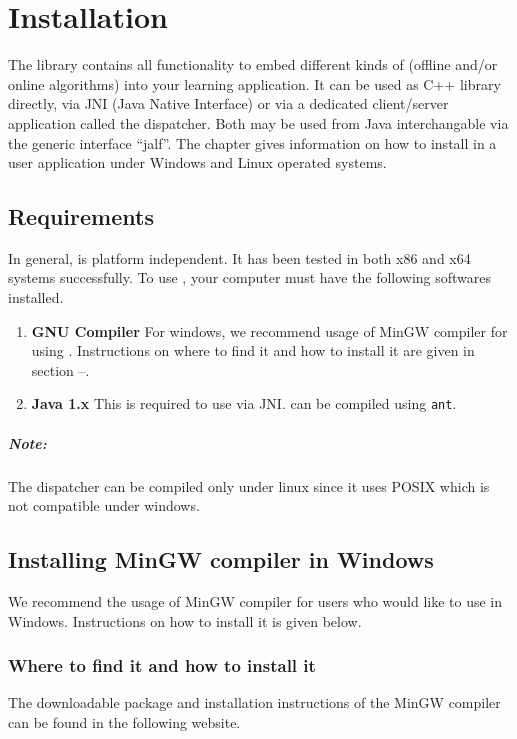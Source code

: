 
\chapter{Installation}
The \libalf library contains all functionality to embed different kinds of (offline and/or online algorithms) into your learning application. It can be used as C++ library directly, via JNI (Java Native Interface) or via a dedicated client/server application called the dispatcher. Both may be used from Java interchangable via the generic interface ``jalf''.
The chapter gives information on how to install \libalf in a user application under Windows and Linux operated systems.

\section{Requirements}
In general, \libalf is platform independent. It has been tested in both x86 and x64 systems successfully. To use \libalf, your computer must have the following softwares installed.
\begin{enumerate}
 \item \textbf{GNU Compiler} \vskip 1pt
	For windows, we recommend usage of MinGW compiler for using \libalf. Instructions on where to find it and how to install it are given in section --.
 \item \textbf{Java 1.x} \vskip 1pt
	This is required to use \libalf via JNI. \libalf can be compiled using \texttt{ant}.
\end{enumerate}
\paragraph{Note:}
The dispatcher can be compiled only under linux since it uses POSIX which is not compatible under windows. 

\section{Installing MinGW compiler in Windows}
We recommend the usage of MinGW compiler for users who would like to use \libalf in Windows. Instructions on how to install it is given below.
\subsection*{Where to find it and how to install it}
The downloadable package and installation instructions of the MinGW compiler can be found in the following website.


